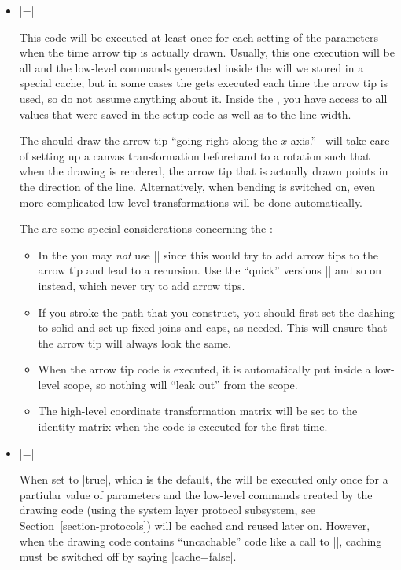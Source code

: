 \begin{command}{\pgfdeclarearrow{}}
\begin{itemize}
  \item {}|=|

    This code will be executed at least once for each setting of the
    parameters when the time arrow tip is actually drawn. Usually,
    this one execution will be all and the 
    low-level commands generated inside the  will we stored
    in a special cache; but in some cases the  gets
    executed each time the arrow tip is used, so do not assume
    anything about it. Inside the , you have access to all
    values that were saved in the setup code as well as to the line
    width.
    
    The  should draw the arrow tip ``going right along the
    $x$-axis.'' \pgfname\ will take care of setting up a  canvas
    transformation beforehand to a rotation such that when the
    drawing is rendered, the arrow tip that is  actually drawn points
    in the direction of the line. Alternatively, when bending is
    switched on, even more complicated low-level transformations will
    be done automatically.
    
    The are some special considerations concerning the :
    \begin{itemize}
    \item
      In the  you may \emph{not} use |\pgfusepath|
      since this would try to add arrow tips to the arrow tip and lead
      to a recursion. Use the ``quick'' versions |\pgfusepathqstroke|
      and so on instead, which never try to add arrow tips.
    \item
      If you stroke the path that you construct, you should first set
      the dashing to solid and set up fixed joins and caps, as
      needed. This will ensure that the arrow tip will always look the
      same.
    \item
      When the arrow tip code is executed, it is automatically put
      inside a low-level scope, so nothing will ``leak out'' from the
      scope.
    \item
      The high-level coordinate transformation matrix will be set to the
      identity matrix when the code is executed for the first time.
    \end{itemize}
    
  \item {}|=|

    When set to |true|, which is the default, the  will be
    executed only once for a partiular value of parameters and the
    low-level commands created by the drawing code (using the system
    layer protocol subsystem, see Section~\ref{section-protocols})
    will be cached and reused later on. However, when the drawing code
    contains ``uncachable'' code like a call to |\pgftext|, caching
    must be switched off by saying |cache=false|.


\end{itemize}
\end{command}
